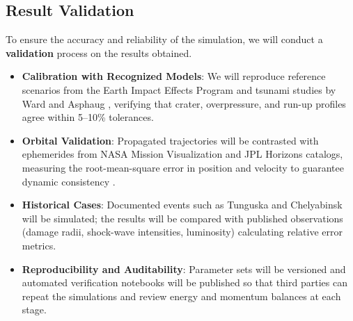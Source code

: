 \documentclass[conference]{IEEEtran}
\begin{document}
\subsection{Result Validation}
To ensure the accuracy and reliability of the simulation, we will conduct a
\textbf{validation} process on the results obtained.
\begin{itemize}
	\item \textbf{Calibration with Recognized Models}: We will reproduce reference
	      scenarios from the Earth Impact Effects Program \cite{collins2005} and
	      tsunami studies by Ward and Asphaug \cite{ward2000,wuennemann2010},
	      verifying that crater, overpressure, and run-up profiles agree within
	      5--10\% tolerances.
	\item \textbf{Orbital Validation}: Propagated trajectories will be contrasted
	      with ephemerides from NASA Mission Visualization and JPL Horizons
	      catalogs, measuring the root-mean-square error in position and velocity to
	      guarantee dynamic consistency \cite{nasaEllipticalOrbit}.
	\item \textbf{Historical Cases}: Documented events such as Tunguska
	      \cite{chyba1993} and Chelyabinsk \cite{popova2013} will be simulated;
	      the results will be compared with published observations (damage radii,
	      shock-wave intensities, luminosity) calculating relative error metrics.
	\item \textbf{Reproducibility and Auditability}: Parameter sets will be
	      versioned and automated verification notebooks will be published so that
	      third parties can repeat the simulations and review energy and momentum
	      balances at each stage.
\end{itemize}
\end{document}

